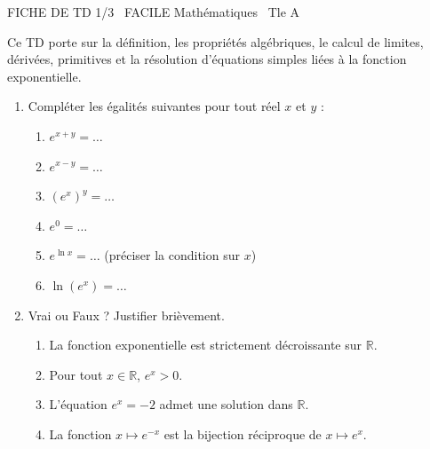 \documentclass[11pt]{article}
\begin{document}
\begin{tcolorbox}[enhanced,colback=popink,colframe=popink,arc=10pt,boxrule=0pt,left=12pt,right=12pt,top=9pt,bottom=9pt]
{\color{white}\popxbold\small FICHE DE TD 1/3 \textbullet\ FACILE \hfill Mathématiques \textbullet\ Tle A\par}
\end{tcolorbox}
\vspace{4pt}
Ce TD porte sur la définition, les propriétés algébriques, le calcul de limites, dérivées, primitives et la résolution d'équations simples liées à la fonction exponentielle.

\begin{exercice}
\begin{enumerate}
    \item Compléter les égalités suivantes pour tout réel $x$ et $y$ :
    \begin{enumerate}
        \item $e^{x+y} = \dots$
        \item $e^{x-y} = \dots$
        \item $(e^{x})^{y} = \dots$
        \item $e^{0} = \dots$
        \item $e^{\ln x} = \dots$ (préciser la condition sur $x$)
        \item $\ln(e^{x}) = \dots$
    \end{enumerate}
    \item Vrai ou Faux ? Justifier brièvement.
    \begin{enumerate}
        \item La fonction exponentielle est strictement décroissante sur $\mathbb{R}$.
        \item Pour tout $x \in \mathbb{R}$, $e^{x} > 0$.
        \item L'équation $e^{x} = -2$ admet une solution dans $\mathbb{R}$.
        \item La fonction $x \mapsto e^{-x}$ est la bijection réciproque de $x \mapsto e^{x}$.
    \end{enumerate}
\end{enumerate}
\end{exercice}
\end{document}
